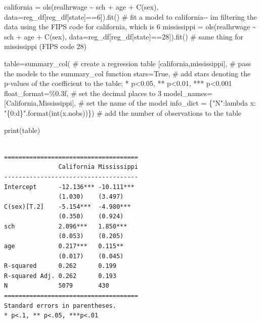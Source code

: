 \documentclass[
  letterpaper,
  DIV=11,
  numbers=noendperiod]{scrreprt}
\newenvironment{Shaded}{\begin{snugshade}}{\end{snugshade}}
\newcommand{\BuiltInTok}[1]{\textcolor[rgb]{0.00,0.23,0.31}{#1}}
\newcommand{\CommentTok}[1]{\textcolor[rgb]{0.37,0.37,0.37}{#1}}
\newcommand{\DecValTok}[1]{\textcolor[rgb]{0.68,0.00,0.00}{#1}}
\newcommand{\KeywordTok}[1]{\textcolor[rgb]{0.00,0.23,0.31}{#1}}
\newcommand{\NormalTok}[1]{\textcolor[rgb]{0.00,0.23,0.31}{#1}}
\newcommand{\OperatorTok}[1]{\textcolor[rgb]{0.37,0.37,0.37}{#1}}
\newcommand{\SpecialCharTok}[1]{\textcolor[rgb]{0.37,0.37,0.37}{#1}}
\newcommand{\StringTok}[1]{\textcolor[rgb]{0.13,0.47,0.30}{#1}}
\newcommand{\VariableTok}[1]{\textcolor[rgb]{0.07,0.07,0.07}{#1}}
\begin{document}
\begin{Shaded}
\begin{Highlighting}[]
\NormalTok{california }\OperatorTok{=}\NormalTok{ ols(}\StringTok{\textquotesingle{}realhrwage \textasciitilde{}  sch + age + C(sex)\textquotesingle{}}\NormalTok{, data}\OperatorTok{=}\NormalTok{reg\_df[reg\_df[}\StringTok{\textquotesingle{}state\textquotesingle{}}\NormalTok{]}\OperatorTok{==}\DecValTok{6}\NormalTok{]).fit()  }\CommentTok{\# fit a model to california{-}{-} i\textquotesingle{}m filtering the data using the FIPS code for california, which is 6}
\NormalTok{mississippi }\OperatorTok{=}\NormalTok{ ols(}\StringTok{\textquotesingle{}realhrwage \textasciitilde{}  sch + age + C(sex)\textquotesingle{}}\NormalTok{, data}\OperatorTok{=}\NormalTok{reg\_df[reg\_df[}\StringTok{\textquotesingle{}state\textquotesingle{}}\NormalTok{]}\OperatorTok{==}\DecValTok{28}\NormalTok{]).fit()  }\CommentTok{\# same thing for mississippi (FIPS code 28)}

\NormalTok{table}\OperatorTok{=}\NormalTok{summary\_col( }\CommentTok{\# create a regression table }
\NormalTok{    [california,mississippi], }\CommentTok{\# pass the models to the summary\_col function}
\NormalTok{    stars}\OperatorTok{=}\VariableTok{True}\NormalTok{, }\CommentTok{\# add stars denoting the p{-}values of the coefficient to the table; * p\textless{}0.05, ** p\textless{}0.01, *** p\textless{}0.001}
\NormalTok{    float\_format}\OperatorTok{=}\StringTok{\textquotesingle{}}\SpecialCharTok{\%0.3f}\StringTok{\textquotesingle{}}\NormalTok{, }\CommentTok{\# set the decimal places to 3}
\NormalTok{    model\_names}\OperatorTok{=}\NormalTok{[}\StringTok{\textquotesingle{}California\textquotesingle{}}\NormalTok{,}\StringTok{\textquotesingle{}Mississippi\textquotesingle{}}\NormalTok{], }\CommentTok{\# set the name of the model}
\NormalTok{    info\_dict }\OperatorTok{=}\NormalTok{ \{}\StringTok{"N"}\NormalTok{:}\KeywordTok{lambda}\NormalTok{ x: }\StringTok{"}\SpecialCharTok{\{0:d\}}\StringTok{"}\NormalTok{.}\BuiltInTok{format}\NormalTok{(}\BuiltInTok{int}\NormalTok{(x.nobs))\}) }\CommentTok{\# add the number of observations to the table}

\BuiltInTok{print}\NormalTok{(table)}
\end{Highlighting}
\end{Shaded}

\begin{verbatim}

=====================================
               California Mississippi
-------------------------------------
Intercept      -12.136*** -10.111*** 
               (1.030)    (3.497)    
C(sex)[T.2]    -5.154***  -4.980***  
               (0.350)    (0.924)    
sch            2.096***   1.850***   
               (0.053)    (0.205)    
age            0.217***   0.115**    
               (0.017)    (0.045)    
R-squared      0.262      0.199      
R-squared Adj. 0.262      0.193      
N              5079       430        
=====================================
Standard errors in parentheses.
* p<.1, ** p<.05, ***p<.01
\end{verbatim}
\end{document}
